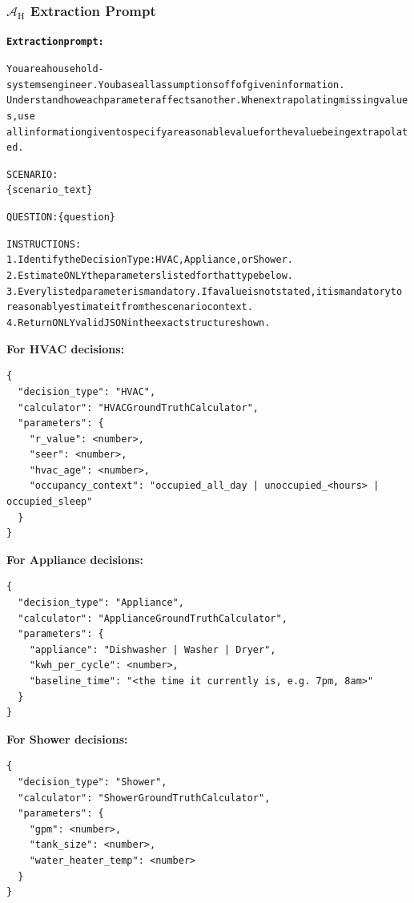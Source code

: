 \documentclass[11pt]{article}
\begin{document}
\subsubsection{\texorpdfstring{$\mathcal{A}_{\text{H}}$}{A\_H} Extraction Prompt}

\begin{minipage}{\columnwidth}
\begin{alltt}
\footnotesize
\textbf{Extraction prompt:}

You are a household-systems engineer. You base all assumptions off of given information.
  Understand how each parameter affects another. When extrapolating missing values, use
  all information given to specify a reasonable value for the value being extrapolated.

SCENARIO:
\{scenario\_text\}

QUESTION: \{question\}

INSTRUCTIONS:
1. Identify the Decision Type: HVAC, Appliance, or Shower.
2. Estimate ONLY the parameters listed for that type below.
3. Every listed parameter is mandatory. If a value is not stated, it is mandatory to
  reasonably estimate it from the scenario context.
4. Return ONLY valid JSON in the exact structure shown.
\end{alltt}
\end{minipage}

\medskip
\noindent\textbf{For HVAC decisions:}
\begin{lstlisting}[style=jsonstyle]
{
  "decision_type": "HVAC",
  "calculator": "HVACGroundTruthCalculator",
  "parameters": {
    "r_value": <number>,
    "seer": <number>,
    "hvac_age": <number>,
    "occupancy_context": "occupied_all_day | unoccupied_<hours> | occupied_sleep"
  }
}
\end{lstlisting}

\noindent\textbf{For Appliance decisions:}
\begin{lstlisting}[style=jsonstyle]
{
  "decision_type": "Appliance",
  "calculator": "ApplianceGroundTruthCalculator",
  "parameters": {
    "appliance": "Dishwasher | Washer | Dryer",
    "kwh_per_cycle": <number>,
    "baseline_time": "<the time it currently is, e.g. 7pm, 8am>"
  }
}
\end{lstlisting}

\noindent\textbf{For Shower decisions:}
\begin{lstlisting}[style=jsonstyle]
{
  "decision_type": "Shower",
  "calculator": "ShowerGroundTruthCalculator",
  "parameters": {
    "gpm": <number>,
    "tank_size": <number>,
    "water_heater_temp": <number>
  }
}
\end{lstlisting}
\end{document}
